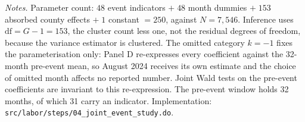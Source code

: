 \vspace{-6pt}
\noindent\begin{minipage}{\textwidth}\scriptsize
\textit{Notes.} Parameter count: $48$ event indicators $+\;48$ month dummies $+\;153$ absorbed county effects $+\;1$ constant $=250$, against $N=7{,}546$. Inference uses $\mathrm{df}=G-1=153$, the cluster count less one, not the residual degrees of freedom, because the variance estimator is clustered. The omitted category $k=-1$ fixes the parameterisation only: Panel D re-expresses every coefficient against the 32-month pre-event mean, so August 2024 receives its own estimate and the choice of omitted month affects no reported number. Joint Wald tests on the pre-event coefficients are invariant to this re-expression. The pre-event window holds 32 months, of which 31 carry an indicator. Implementation: \texttt{src/labor/steps/04\_joint\_event\_study.do}.
\end{minipage}
\endgroup

